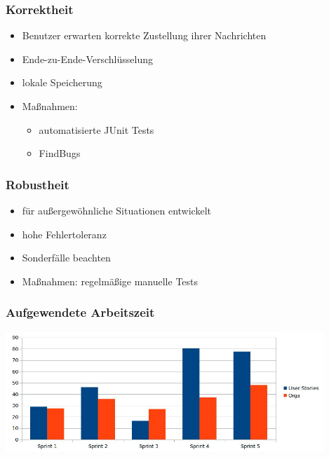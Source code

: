 \documentclass[accentcolor=tud2d,colorbacktitle]{tudbeamer}
\begin{document}
  \begin{frame}
    \frametitle{Korrektheit}
    \begin{itemize}
      \item Benutzer erwarten korrekte Zustellung ihrer Nachrichten
      \item Ende-zu-Ende-Verschlüsselung
      \item lokale Speicherung
    \end{itemize}
    \begin{itemize}
      \item Maßnahmen:
        \begin{itemize}
          \item automatisierte JUnit Tests
          \item FindBugs
        \end{itemize}
    \end{itemize}
  \end{frame}

  \begin{frame}
    \frametitle{Robustheit}
    \begin{itemize}
      \item für außergewöhnliche Situationen entwickelt
      \item hohe Fehlertoleranz
      \item Sonderfälle beachten
    \end{itemize}
    \begin{itemize}
      \item Maßnahmen: regelmäßige manuelle Tests
    \end{itemize}
  \end{frame}

  \begin{frame}
    \frametitle{Aufgewendete Arbeitszeit}
    \begin{center}
      \includegraphics[height=4.5cm]{zeiten.jpg}
    \end{center}
  \end{frame}
\end{document}
